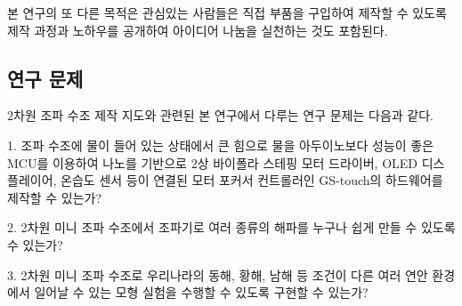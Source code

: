 본 연구의 또 다른 목적은 관심있는 사람들은 직접 부품을 구입하여 제작할 수 있도록 제작 과정과 노하우를 공개하여 아이디어 나눔을 실천하는 것도 포함된다.



\subsection{연구 문제}

2차원 조파 수조 제작 지도와 관련된 본 연구에서 다루는 연구 문제는 다음과 같다. 

1. 조파 수조에 물이 들어 있는 상태에서 큰 힘으로 물을 아두이노보다 성능이 좋은 MCU를 이용하여  나노를 기반으로 2상 바이폴라 스테핑 모터 드라이버, OLED 디스플레이어, 온습도 센서 등이 연결된 모터 포커서 컨트롤러인 GS-touch의 하드웨어를 제작할 수 있는가?

2. 2차원 미니 조파 수조에서 조파기로 여러 종류의 해파를 누구나 쉽게 만들 수 있도록 수 있는가?

3. 2차원 미니 조파 수조로 우리나라의 동해, 황해, 남해 등 조건이 다른 여러 연안 환경에서 일어날 수 있는 모형 실험을 수행할 수 있도록 구현할 수 있는가?

